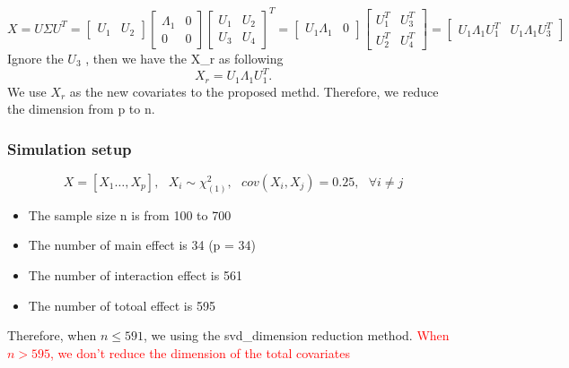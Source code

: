 \documentclass[]{article}
\providecommand{\tightlist}{%
  \setlength{\itemsep}{0pt}\setlength{\parskip}{0pt}}
\begin{document}
\[
  X = U \Sigma U^T = \begin{bmatrix}
                      U_1 & U_2
                      \end{bmatrix}
                      \begin{bmatrix}
                      \Lambda_1 & 0\\
                      0 & 0
                      \end{bmatrix}
                      \begin{bmatrix}
                      U_1 & U_2\\
                      U_3 & U_4
                      \end{bmatrix}^T 
                      = 
                      \begin{bmatrix}
                      U_1\Lambda_1 & 0
                      \end{bmatrix}
                      \begin{bmatrix}
                      U_1^T & U_3^T\\
                      U_2^T & U_4^T
                      \end{bmatrix}
                      =
                      \begin{bmatrix}
                      U_1\Lambda_1U_1^T & U_1\Lambda_1U_3^T
                      \end{bmatrix}
\] Ignore the \(U_3\) , then we have the X\_r as following \[
  X_r = U_1\Lambda_1U_1^T.
\] We use \(X_r\) as the new covariates to the proposed methd.
Therefore, we reduce the dimension from p to n.

\subsubsection{Simulation setup}\label{simulation-setup}

\[
  X = [X_1 \dots, X_p] ,~~~ X_i \sim \chi_{(1)}^2, ~~~ cov(X_i, X_j) = 0.25,~~~ \forall  i \ne j 
\]

\begin{itemize}
\tightlist
\item
  The sample size n is from 100 to 700
\item
  The number of main effect is 34 (p = 34)
\item
  The number of interaction effect is 561
\item
  The number of totoal effect is 595
\end{itemize}

Therefore, when \(n\leq591\), we using the svd\_dimension reduction
method.
\textcolor{red}{When $n > 595$, we don't reduce the dimension of the total covariates}
\end{document}
